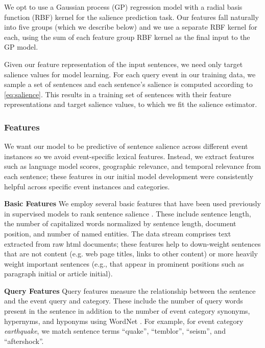 We opt to use a Gaussian process (GP) regression model \citep{rasmussen2005}
with a radial basis function (RBF) kernel for the salience prediction task.
Our features fall naturally into five groups (which we describe below) and we
use a separate RBF kernel for each, using the sum of each feature group RBF
kernel as the final input to the GP model.

Given our feature representation of the input sentences, we need only target
salience values for model learning. For each query event in our training data,
we sample a set of sentences and  each sentence's salience is computed
according to \autoref{eq:salience}. This results in a training set of sentences
with their feature representations and target salience values, to which we fit
the salience estimator.

\subsubsection{Features} \label{sec:features}

We want our model to be predictive of sentence salience across different event
instances so we avoid event-specific lexical features.  Instead, we extract
features such as language model scores, geographic relevance, and temporal
relevance from each sentence; these features in our initial model development
were consistently helpful across specific event instances and categories.

\textbf{Basic Features} We employ several basic features that have been used
previously in supervised models to rank sentence salience
\citep{kupiec1995trainable,conroy2001}.  These include sentence length, the
number of capitalized words normalized by sentence length, document position,
and number of named entities.  The data stream comprises text extracted from
raw html documents; these features help to down-weight sentences that are not
content (e.g. web page titles, links to other content) or more heavily weight
important sentences (e.g., that appear in prominent positions such as paragraph
initial or article initial).

\textbf{Query Features} Query features measure the relationship between the
sentence and the event query and category.  These include the number of query
words present in the sentence in addition to the number of event category
synonyms, hypernyms, and hyponyms using WordNet \citep{miller1995wordnet}.  For
example, for event category \emph{earthquake},  we match sentence terms
``quake'', ``temblor'', ``seism'', and ``aftershock''.

